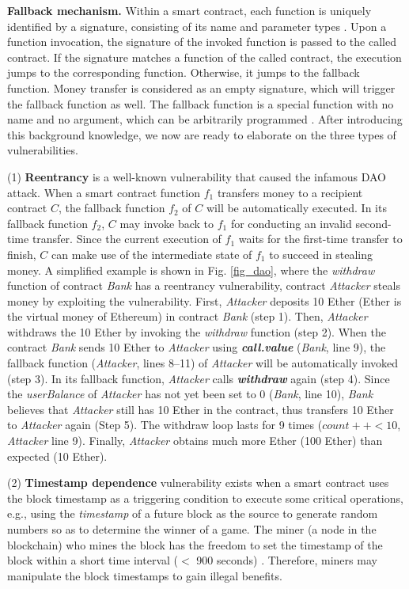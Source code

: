 \textbf{Fallback mechanism.} Within a smart contract, each function is uniquely identified by a signature, consisting of its name and parameter types \cite{Sok}. Upon a function invocation, the signature of the invoked function is passed to the called contract. If the signature matches a function of the called contract, the execution jumps to the corresponding function. Otherwise, it jumps to the fallback function. Money transfer is considered as an empty signature, which will trigger the fallback function as well. The fallback function is a special function with no name and no argument, which can be arbitrarily programmed \cite{Sok}. After introducing this background knowledge, we now are ready to elaborate on the three types of vulnerabilities.

(1) \textbf{Reentrancy} is a well-known vulnerability that caused the infamous DAO attack. When a smart contract function $f_1$ transfers money to a recipient contract $C$, the fallback function $f_2$ of $C$ will be automatically executed. In its fallback function $f_2$, $C$ may invoke back to $f_1$  for conducting an invalid second-time transfer. Since the current execution of $f_1$ waits for the first-time transfer to finish, $C$ can make use of the intermediate state of $f_1$ to succeed in stealing money. A simplified example is shown in Fig. \ref{fig_dao}, where the \emph{withdraw} function of contract \emph{Bank} has a reentrancy vulnerability, contract \emph{Attacker} steals money by exploiting the vulnerability. First, \emph{Attacker} deposits 10 Ether (Ether is the virtual money of Ethereum) in contract \emph{Bank} (step 1). Then, \emph{Attacker} withdraws the 10 Ether by invoking the {\emph{withdraw}} function (step 2). When the contract \emph{Bank} sends 10 Ether to \emph{Attacker} using \textbf{\emph{call.value}} (\emph{Bank}, line 9), the fallback function (\emph{Attacker}, lines 8--11) of \emph{Attacker} will be automatically invoked (step 3). In its fallback function, \emph{Attacker} calls \textbf{\emph{withdraw}} again (step 4). Since the {\emph{userBalance}} of \emph{Attacker} has not yet been set to 0 (\emph{Bank}, line 10), \emph{Bank} believes that \emph{Attacker} still has {10 Ether} in the contract, thus transfers 10 Ether to \emph{Attacker} again (Step 5). The withdraw loop lasts for 9 times ({\small$count++ < 10$}, \emph{Attacker} line 9). Finally, \emph{Attacker} obtains much more Ether (100 Ether) than expected (10 Ether).

(2) \textbf{Timestamp dependence} vulnerability exists when a smart contract uses the block timestamp as a triggering condition to execute some critical operations, e.g., using the \emph{timestamp} of a future block as the source to generate random numbers so as to determine the winner of a game. The miner (a node in the blockchain) who mines the block has the freedom to set the timestamp of the block within a short time interval ($<$ 900 seconds) \cite{contractfuzzer}. Therefore, miners may manipulate the block timestamps to gain illegal benefits.

